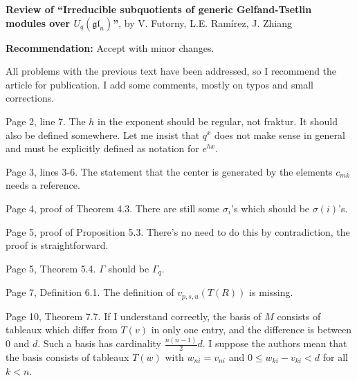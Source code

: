 \documentclass[11pt,fleqn]{article}
\begin{document}
\noindent\textbf{Review of 
``Irreducible subquotients of generic Gelfand-Tsetlin modules over 
$U_q(\mathfrak{gl}_n)$''}, by V. Futorny, L.E. Ramírez, J. Zhiang

\noindent\textbf{Recommendation:} Accept with minor changes.

All problems with the previous text have been addressed, so I recommend the 
article for publication. I add some comments, mostly on typos and small 
corrections.

\bigskip

Page 2, line 7. The $h$ in the exponent should be regular, not fraktur. It 
should also be defined somewhere. Let me insist that $q^x$ does not make sense 
in general and must be explicitly defined as notation for $e^{hx}$.

Page 3, lines 3-6. The statement that the center is generated by the elements
$c_{mk}$ needs a reference.

Page 4, proof of Theorem 4.3. There are still some $\sigma_i$'s which should be
$\sigma(i)$'s.

Page 5, proof of Proposition 5.3. There's no need to do this by contradiction,
the proof is straightforward.

Page 5, Theorem 5.4. $\Gamma$ should be $\Gamma_q$.

Page 7, Definition 6.1. The definition of $v_{p,s,u}(T(R))$ is missing.

Page 10, Theorem 7.7. If I understand correctly, the basis of $M$ consists of
tableaux which differ from $T(v)$ in only one entry, and the difference is 
between $0$ and $d$. Such a basis has cardinality $\frac{n(n-1)}{2}d$. I 
suppose the authors mean that the basis consists of tableaux $T(w)$ with 
$w_{ni} = v_{ni}$ and $0 \leq w_{ki} - v_{ki} < d$ for all $k < n$.
\end{document}
